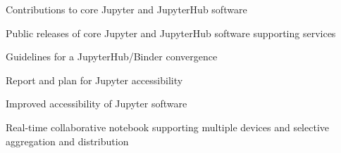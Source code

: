\begin{workpackage}
\begin{wpdescription}
\end{wpdescription}

\begin{tasklist}






\end{tasklist}


\begin{wpdelivs}

  \begin{wpdeliv}[due=24,miles=prototype,id=jupyter-contributions,dissem=PU,nature=OTHER,lead=SRL]
    {Contributions to core Jupyter and JupyterHub software}
  \end{wpdeliv}

  \begin{wpdeliv}[due=48,miles=final,id=jupyter-releases,dissem=PU,nature=OTHER,lead=SRL]
    {Public releases of core Jupyter and JupyterHub software supporting \TheProject services}
  \end{wpdeliv}

  \begin{wpdeliv}[due=36,miles=community,id=jh-bh-conv-report,dissem=PU,nature=R,lead=EP]
    {Guidelines for a JupyterHub/Binder convergence}
  \end{wpdeliv}

  \begin{wpdeliv}[due=18,miles=prototype,id=accessibility-report,dissem=PU,nature=R,lead=SRL]
    {Report and plan for Jupyter accessibility}
  \end{wpdeliv}

  \begin{wpdeliv}[due=36,miles=community,id=accessibility,dissem=PU,nature=OTHER,lead=SRL]
    {Improved accessibility of Jupyter software}
  \end{wpdeliv}

  \begin{wpdeliv}[due=36,miles=community,id=server-state,dissem=PU,nature=OTHER,lead=UPSUD]
    {Real-time collaborative notebook supporting multiple devices and selective aggregation and distribution}
  \end{wpdeliv}

\end{wpdelivs}

\end{workpackage}

